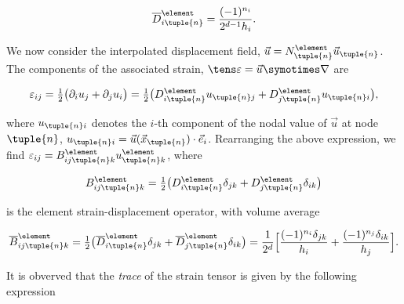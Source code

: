 \documentclass[oneside]{memoir}
\begin{document}
\begin{equation*}
\begin{split}\overline{D}^\element_{i\tuple{n}}=\frac{(-1)^{n_i}}{2^{d-1}h_i}.\end{split}\end{equation*}


We now consider the interpolated displacement field, \(\vec u = N^\element_\tuple{n} \vec u_\tuple{n}\). The components of the associated strain, \(\tens\varepsilon=\vec u\symotimes\nabla\) are



\begin{equation*}
\begin{split}\varepsilon_{ij}=\tfrac12\bigl(\partial_iu_j+\partial_ju_i\bigr)
=\tfrac12\bigl(D^\element_{i\tuple{n}}u_{\tuple{n}j}
+D^\element_{j\tuple{n}}u_{\tuple{n}i}\bigr),\end{split}\end{equation*}


where \(u_{\tuple{n}i}\) denotes the \(i\)-th component of the nodal value of \(\vec u\) at node \(\tuple{n}\), \(u_{\tuple{n}i}=\vec u(\vec x_\tuple{n})\cdot\vec e_i\). Rearranging the above expression, we find \(\varepsilon_{ij}=B^\element_{ij\tuple{n}k}u_{\tuple{n}k}^\element\), where



\begin{equation*}
\begin{split}B_{ij\tuple{n}k}^\element
=\tfrac12\bigl(D^\element_{i\tuple{n}}\delta_{jk}
+D^\element_{j\tuple{n}}\delta_{ik}\bigr)\end{split}\end{equation*}


is the element strain-displacement operator, with volume average



\begin{equation*}
\begin{split}\overline{B}_{ij\tuple{n}k}^\element
=\tfrac12\bigl(\overline{D}^\element_{i\tuple{n}}\delta_{jk}
+\overline{D}^\element_{j\tuple{n}}\delta_{ik}\bigr)
=\frac1{2^d}\Bigl[\frac{(-1)^{n_i}\delta_{jk}}{h_i}
+\frac{(-1)^{n_j}\delta_{ik}}{h_j}\Bigr].\end{split}\end{equation*}


It is obverved that the \emph{trace} of the strain tensor is given by the following expression
\end{document}
